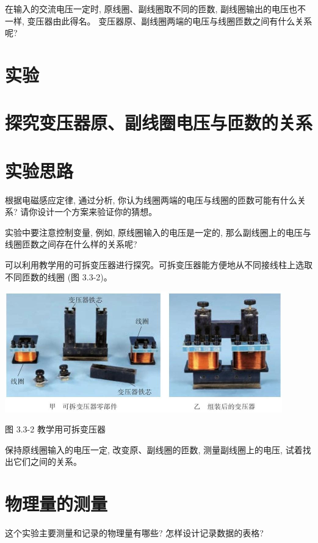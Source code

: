 \documentclass[10pt]{article}
\begin{document}
在输入的交流电压一定时, 原线圈、副线圈取不同的匝数, 副线圈输出的电压也不一样, 变压器由此得名。 变压器原、副线圈两端的电压与线圈匝数之间有什么关系呢?

\section*{实验}

\section*{探究变压器原、副线圈电压与匝数的关系}

\section*{实验思路}

根据电磁感应定律, 通过分析, 你认为线圈两端的电压与线圈的匝数可能有什么关系? 请你设计一个方案来验证你的猜想。

实验中要注意控制变量, 例如, 原线圈输入的电压是一定的, 那么副线圈上的电压与线圈匝数之间存在什么样的关系呢?

可以利用教学用的可拆变压器进行探究。可拆变压器能方便地从不同接线柱上选取不同匝数的线圈 (图 3.3-2)。

\begin{center}
\includegraphics[max width=0.9\textwidth]{images/01910e72-c5b7-7ed5-a6d4-fb3a5faefc32_64_517933.jpg}
\end{center}

图 3.3-2 教学用可拆变压器

保持原线圈输入的电压一定, 改变原、副线圈的匝数, 测量副线圈上的电压, 试着找出它们之间的关系。

\section*{物理量的测量}

这个实验主要测量和记录的物理量有哪些? 怎样设计记录数据的表格?
\end{document}
